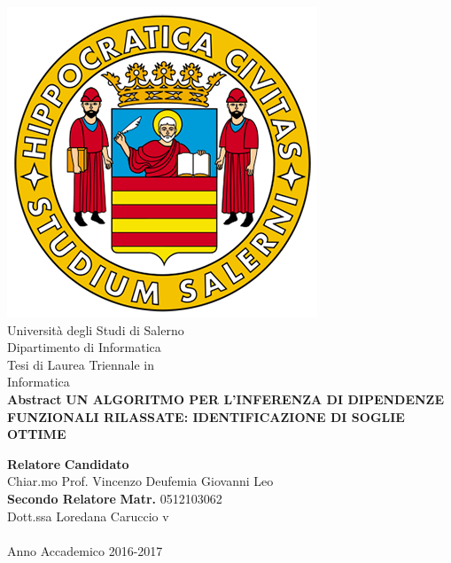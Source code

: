 \begin{center}
    \includegraphics[scale = 0.30]{Immagini/logoUnisa.png}\\
    \vspace{1cm}
    {\Large Università degli Studi di Salerno}\\[0.2truecm]
    {\large Dipartimento di Informatica}\\
    \hrulefill
    \vfill
    {\large Tesi di Laurea Triennale in }\\[0.2truecm]
    {\Large Informatica}\\
    {\large \bf Abstract}
    \vfill
    {\large \bf UN ALGORITMO PER L'INFERENZA DI DIPENDENZE 
    FUNZIONALI RILASSATE: IDENTIFICAZIONE DI SOGLIE OTTIME}
    \vfill\vfill
    
    {\bf Relatore} \hfill {\bf Candidato} \\
    Chiar.mo Prof. Vincenzo Deufemia \hfill Giovanni Leo \\
    {\bf Secondo Relatore}
    \hfill\textbf{ Matr.} 0512103062\\
    
    
    Dott.ssa Loredana Caruccio  \hfill {\phantom v} \\
    \vspace{1cm}
    \hrulefill \\
  	\vspace{1cm}
    Anno Accademico 2016-2017
\end{center}